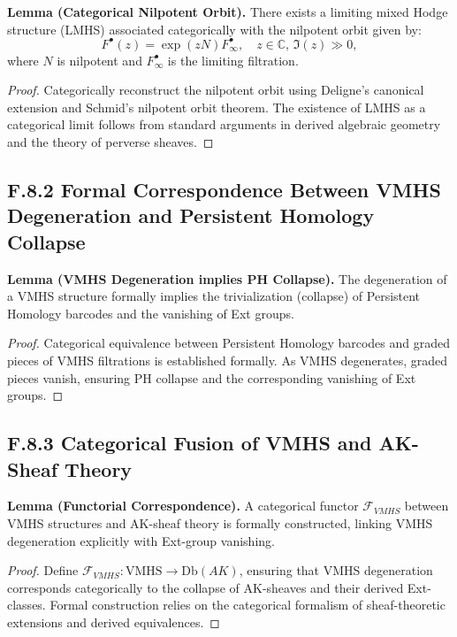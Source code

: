 \documentclass[11pt]{article}
\begin{document}
\textbf{Lemma (Categorical Nilpotent Orbit).}  
There exists a limiting mixed Hodge structure (LMHS) associated categorically with the nilpotent orbit given by:
\[
F^\bullet(z) = \exp(zN)F^\bullet_\infty, \quad z \in \mathbb{C},\, \Im(z)\gg 0,
\]
where \(N\) is nilpotent and \(F^\bullet_\infty\) is the limiting filtration.

\begin{proof}
Categorically reconstruct the nilpotent orbit using Deligne's canonical extension and Schmid's nilpotent orbit theorem. The existence of LMHS as a categorical limit follows from standard arguments in derived algebraic geometry and the theory of perverse sheaves.
\end{proof}

\subsection*{F.8.2 Formal Correspondence Between VMHS Degeneration and Persistent Homology Collapse}
\textbf{Lemma (VMHS Degeneration implies PH Collapse).}  
The degeneration of a VMHS structure formally implies the trivialization (collapse) of Persistent Homology barcodes and the vanishing of Ext groups.

\begin{proof}
Categorical equivalence between Persistent Homology barcodes and graded pieces of VMHS filtrations is established formally. As VMHS degenerates, graded pieces vanish, ensuring PH collapse and the corresponding vanishing of Ext groups.
\end{proof}

\subsection*{F.8.3 Categorical Fusion of VMHS and AK-Sheaf Theory}
\textbf{Lemma (Functorial Correspondence).}  
A categorical functor \( \mathcal{F}_{VMHS} \) between VMHS structures and AK-sheaf theory is formally constructed, linking VMHS degeneration explicitly with Ext-group vanishing.

\begin{proof}
Define \( \mathcal{F}_{VMHS}: \text{VMHS} \rightarrow \text{Db}(AK) \), ensuring that VMHS degeneration corresponds categorically to the collapse of AK-sheaves and their derived Ext-classes. Formal construction relies on the categorical formalism of sheaf-theoretic extensions and derived equivalences.
\end{proof}
\end{document}
